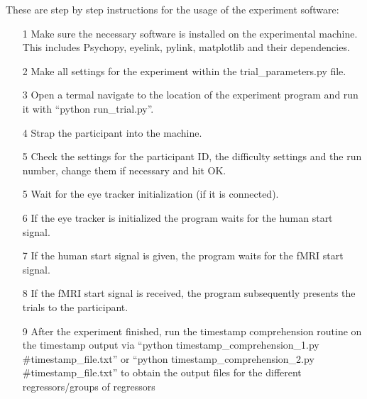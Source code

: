 These are step by step instructions for the usage of the experiment software:
\begin{itemize}
    \item[1] Make sure the necessary software is installed on the experimental machine. This includes Psychopy, eyelink, pylink, matplotlib and their dependencies.
    \item[2] Make all settings for the experiment within the trial\_parameters.py file.
    \item[3] Open a termal navigate to the location of the experiment program  and run it with ``python run\_trial.py''.
    \item[4] Strap the participant into the machine.
    \item[5] Check the settings for the participant ID, the difficulty settings and the run number, change them if necessary and hit OK.
    \item[5] Wait for the eye tracker initialization (if it is connected).
    \item[6] If the eye tracker is initialized the program waits for the human start signal.
    \item[7] If the human start signal is given, the program waits for the fMRI start signal.
    \item[8] If the fMRI start signal is received, the program subsequently presents the trials to the participant.
    \item[9] After the experiment finished, run the timestamp comprehension routine on the timestamp output via ``python timestamp\_comprehension\_1.py \#timestamp\_file.txt'' or ``python timestamp\_comprehension\_2.py \#timestamp\_file.txt'' to obtain the output files for the different regressors/groups of regressors
        
\end{itemize}


